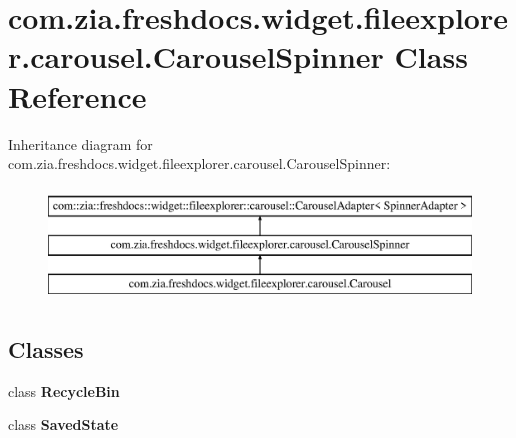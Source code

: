 \hypertarget{classcom_1_1zia_1_1freshdocs_1_1widget_1_1fileexplorer_1_1carousel_1_1_carousel_spinner}{\section{com.\-zia.\-freshdocs.\-widget.\-fileexplorer.\-carousel.\-Carousel\-Spinner Class Reference}
\label{classcom_1_1zia_1_1freshdocs_1_1widget_1_1fileexplorer_1_1carousel_1_1_carousel_spinner}
}
Inheritance diagram for com.\-zia.\-freshdocs.\-widget.\-fileexplorer.\-carousel.\-Carousel\-Spinner\-:\begin{figure}[H]
\begin{center}
\leavevmode
\includegraphics[height=3.000000cm]{classcom_1_1zia_1_1freshdocs_1_1widget_1_1fileexplorer_1_1carousel_1_1_carousel_spinner}
\end{center}
\end{figure}
\subsection*{Classes}
\begin{DoxyCompactItemize}
\item 
class {\bfseries Recycle\-Bin}
\item 
class {\bfseries Saved\-State}
\end{DoxyCompactItemize}
